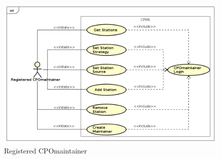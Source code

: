\begin{figure}[!h]
    \includegraphics[keepaspectratio, width=16cm]{UseCase/RegisteredCPOmaintainer.png}
    \caption{Registered \ac{CPO}maintainer}
\end{figure}
\clearpage
